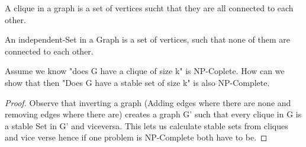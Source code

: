 \begin{definition}
    A clique in a graph is a set of vertices sucht that they are all connected to each other.
\end{definition}

\begin{definition}
    An independent-Set in a Graph is a set of vertices, such that none of them are connected to each other.
\end{definition}

\begin{example}
    Assume we know "does G have a clique of size k" is NP-Coplete. How can we show that then "Does G have a stable set of size k" is also NP-Complete.
\end{example}

\begin{proof}
    Observe that inverting a graph (Adding edges where there are none and removing edges where there are) creates a graph G' such that every clique in G is a stable Set in G' and viceversa. This lets us calculate stable sets from cliques and vice verse hence if one problem is NP-Complete both have to be.
\end{proof}

